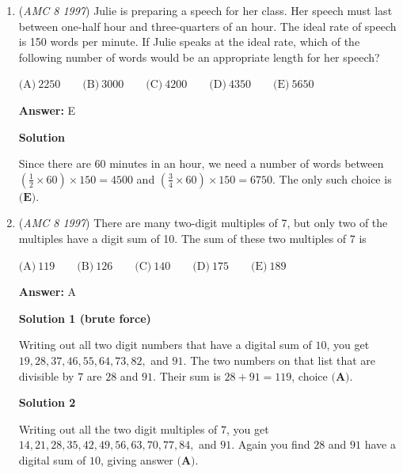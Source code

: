 \begin{enumerate}
 Thousandths digit:$B$ has the largest thousandths digit of the remaining answers, and is the correct answer.  $A$ has an "invisible" thousandths digit of $0$, while $C$ also has a thousdandths digit of $0$.

 $\boxed{\textbf{(B)}}$



	\item (\textit{AMC 8 1997}) Julie is preparing a speech for her class.  Her speech must last between one-half hour and three-quarters of an hour.  The ideal rate of speech is 150 words per minute.  If Julie speaks at the ideal rate, which of the following number of words would be an appropriate length for her speech?


 $\text{(A)}\ 2250 \qquad \text{(B)}\ 3000 \qquad \text{(C)}\ 4200 \qquad \text{(D)}\ 4350 \qquad \text{(E)}\ 5650$

 \textbf{Answer: }E



\textbf{Solution}

Since there are $60$ minutes in an hour, we need a number of words between $(\frac{1}{2}\times 60)\times150=4500$ and $(\frac{3}{4}\times60)\times150=6750$.  The only such choice is $\boxed{\textbf{(E)}}$.

 


	\item (\textit{AMC 8 1997}) There are many two-digit multiples of 7, but only two of the multiples have a digit sum of 10.  The sum of these two multiples of 7 is


 $\text{(A)}\ 119 \qquad \text{(B)}\ 126 \qquad \text{(C)}\ 140 \qquad \text{(D)}\ 175 \qquad \text{(E)}\ 189$

 \textbf{Answer: }A



\textbf{Solution 1 (brute force)}

Writing out all two digit numbers that have a digital sum of $10$, you get $19, 28, 37, 46, 55, 64, 73, 82,$ and $91$.  The two numbers on that list that are divisible by $7$ are $28$ and $91$.  Their sum is $28+91=119$, choice $\boxed{\textbf{(A)}}$.

 



\textbf{Solution 2}

Writing out all the two digit multiples of $7$, you get $14, 21, 28, 35, 42, 49, 56, 63, 70, 77, 84,$ and $91$.  Again you find $28$ and $91$ have a digital sum of $10$, giving answer $\boxed{\textbf{(A)}}$.


\end{enumerate}
